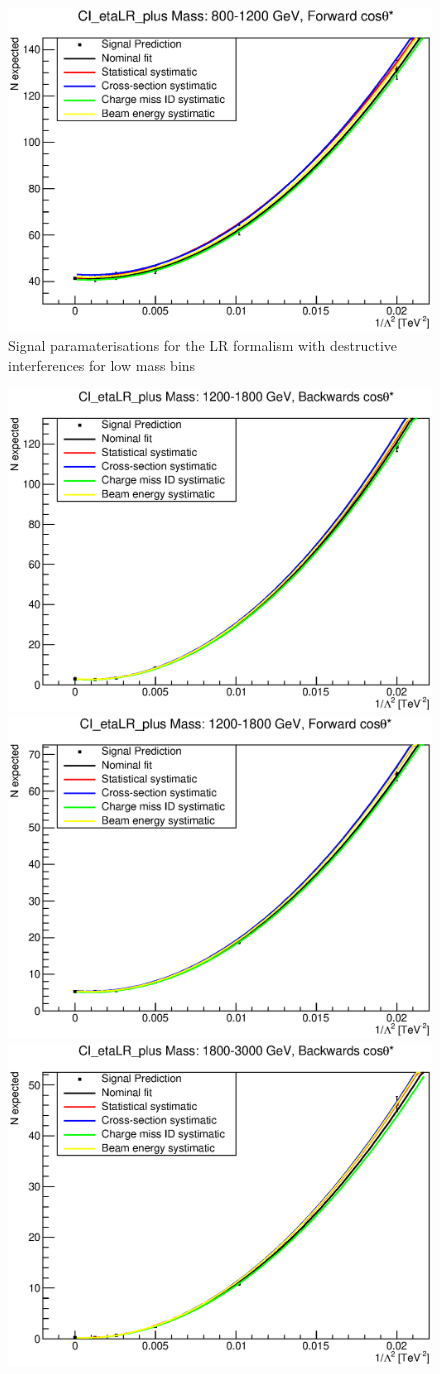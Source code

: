 \begin{figure}[ht]
			\includegraphics[width=0.49\linewidth]{images/thesis_fits/CI_2D_etaLR_plus_Mass_800-1200_GeV_CTS_0_1.eps}
		\caption{Signal paramaterisations for the LR formalism with destructive interferences for low mass bins}
		\label{fig:parm_LR_p_1}
	\end{figure}

	\begin{figure}[ht]
		\centering
			\includegraphics[width=0.49\linewidth]{images/thesis_fits/CI_2D_etaLR_plus_Mass_1200-1800_GeV_CTS_-1_0.eps}
			\includegraphics[width=0.49\linewidth]{images/thesis_fits/CI_2D_etaLR_plus_Mass_1200-1800_GeV_CTS_0_1.eps}
			\includegraphics[width=0.49\linewidth]{images/thesis_fits/CI_2D_etaLR_plus_Mass_1800-3000_GeV_CTS_-1_0.eps}

\end{figure}
